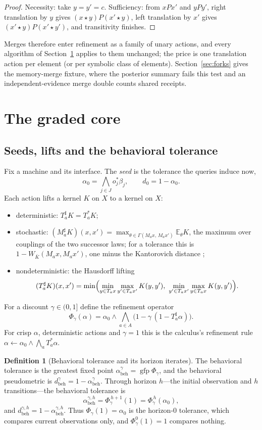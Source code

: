 \documentclass[11pt]{article}
\newcommand{\lift}{^{\sharp}}
\newcommand{\gfp}{\operatorname{gfp}}
\newcommand{\abeh}{\alpha_{\mathrm{beh}}}
\newcommand{\dbeh}{d_{\mathrm{beh}}}
\theoremstyle{definition}
\newtheorem{definition}{Definition}[section]
\theoremstyle{plain}
\begin{document}
\begin{proof}
Necessity: take $y=y'=c$. Sufficiency: from $xPx'$ and $yPy'$, right translation by $y$ gives
$(x\star y)P(x'\star y)$, left translation by $x'$ gives $(x'\star y)P(x'\star y')$, and
transitivity finishes.
\end{proof}

Merges therefore enter refinement as a family of unary actions, and every algorithm of
Section~\ref{sec:graded} applies to them unchanged; the price is one translation action per
element (or per symbolic class of elements). Section~\ref{sec:forks} gives the memory-merge
fixture, where the posterior summary fails this test and an independent-evidence merge double
counts shared receipts.

\section{The graded core}\label{sec:graded}

\subsection{Seeds, lifts and the behavioral tolerance}\label{sec:behavioral}

Fix a machine and its interface. The \emph{seed} is the tolerance the queries induce now,
\[
\alpha_0=\bigwedge_{j\in J}o_j^*\beta_j,\qquad d_0=1-\alpha_0 .
\]
Each action lifts a kernel $K$ on $X$ to a kernel on $X$:
\begin{itemize}
\item deterministic: $T_a\lift K=T_a^*K$;
\item stochastic: $(M_a\lift K)(x,x')=\max_{\theta\in\Gamma(M_ax,\,M_ax')}\mathbb E_\theta K$, the
maximum over couplings of the two successor laws; for a tolerance this is
$1-W_{\bar K}(M_ax,M_ax')$, one minus the Kantorovich distance \cite{dclosure};
\item nondeterministic: the Hausdorff lifting
\[
(T_a\lift K)(x,x')=\min\Bigl(\min_{y\in T_ax}\max_{y'\in T_ax'}K(y,y'),\
\min_{y'\in T_ax'}\max_{y\in T_ax}K(y,y')\Bigr).
\]
\end{itemize}
For a discount $\gamma\in(0,1]$ define the refinement operator
\[
\Phi_\gamma(\alpha)=\alpha_0\wedge\bigwedge_{a\in A}\bigl(1-\gamma\,(1-T_a\lift\alpha)\bigr).
\]
For crisp $\alpha$, deterministic actions and $\gamma=1$ this is the calculus's refinement rule
$\alpha\leftarrow\alpha_0\wedge\bigwedge_aT_a^*\alpha$.

\begin{definition}[Behavioral tolerance and its horizon iterates]\label{def:behavioral}
The behavioral tolerance is the greatest fixed point $\abeh^{\gamma}=\gfp\Phi_\gamma$, and the
behavioral pseudometric is $\dbeh^\gamma=1-\abeh^\gamma$. Through horizon $h$---the initial
observation and $h$ transitions---the behavioral tolerance is
\[
\abeh^{\gamma,h}=\Phi_\gamma^{\,h+1}(1)=\Phi_\gamma^{\,h}(\alpha_0),
\]
and $\dbeh^{\gamma,h}=1-\abeh^{\gamma,h}$. Thus $\Phi_\gamma(1)=\alpha_0$ is the horizon-$0$
tolerance, which compares current observations only, and $\Phi_\gamma^0(1)=1$ compares nothing.
\end{definition}
\end{document}
